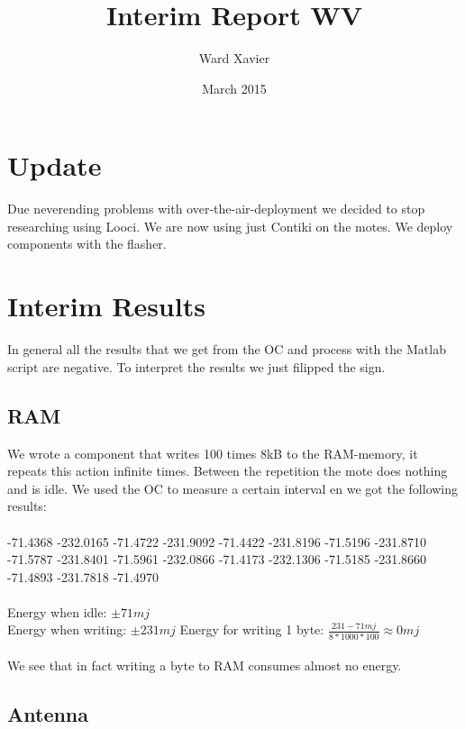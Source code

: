 \documentclass{article}
\title{Interim Report WV}
\author{Ward  Xavier}
\date{March 2015}
\begin{document}
\maketitle

\section{Update}
Due neverending problems with over-the-air-deployment we decided to stop researching using Looci. We are now using just Contiki on the motes. We deploy components with the flasher.
\section{Interim Results}
In general all the results that we get from the OC and process with the Matlab script are negative. To interpret the results we just filipped the sign.
\subsection{RAM}
We wrote a component that writes 100 times 8kB to the RAM-memory, it repeats this action infinite times. Between the repetition the mote does nothing and is idle. We used the OC to measure a certain interval en we got the following results:\\
\\
-71.4368 -232.0165  -71.4722 -231.9092  -71.4422 -231.8196  -71.5196 -231.8710  -71.5787 -231.8401  -71.5961 -232.0866  -71.4173 -232.1306  -71.5185 -231.8660  -71.4893 -231.7818  -71.4970
\\
\\
Energy when idle: $\pm 71 mj$\\
Energy when writing: $\pm 231 mj$
Energy for writing 1 byte: $ \frac{231-71 mj}{8*1000*100} \approx 0 mj$
\\
\\
We see that in fact writing a byte to RAM consumes almost no energy.
\subsection{Antenna}
\end{document}
